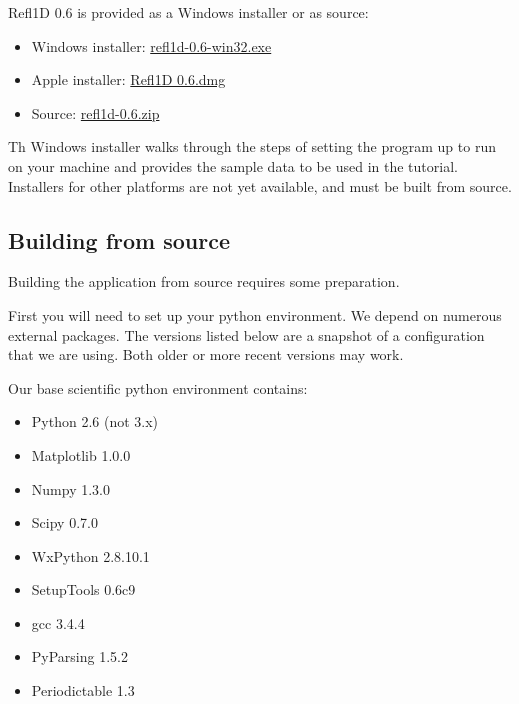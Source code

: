 \documentclass[letterpaper,10pt,english]{sphinxmanual}
\begin{document}
Refl1D 0.6 is provided as a Windows installer or as source:
\begin{itemize}
\item {} 
Windows installer: \href{http://www.reflectometry.org/danse/download.php?file=refl1d-0.6-win32.exe}{refl1d-0.6-win32.exe}

\item {} 
Apple installer: \href{http://www.reflectometry.org/danse/download.php?file=Refl1D 0.6.dmg}{Refl1D 0.6.dmg}

\item {} 
Source: \href{http://www.reflectometry.org/danse/download.php?file=refl1d-0.6.zip}{refl1d-0.6.zip}

\end{itemize}

Th Windows installer walks through the steps of setting the program up
to run on your machine and provides the sample data to be used in the
tutorial.  Installers for other platforms are not yet available, and
must be built from source.


\subsection{Building from source}
\label{getting_started/install:building-from-source}
Building the application from source requires some preparation.

First you will need to set up your python environment.  We depend on
numerous external packages.  The versions listed below are a snapshot
of a configuration that we are using. Both older or more recent versions
may work.

Our base scientific python environment contains:
\begin{itemize}
\item {} 
Python 2.6 (not 3.x)

\item {} 
Matplotlib 1.0.0

\item {} 
Numpy 1.3.0

\item {} 
Scipy 0.7.0

\item {} 
WxPython 2.8.10.1

\item {} 
SetupTools 0.6c9

\item {} 
gcc 3.4.4

\item {} 
PyParsing 1.5.2

\item {} 
Periodictable 1.3

\end{itemize}
\end{document}
